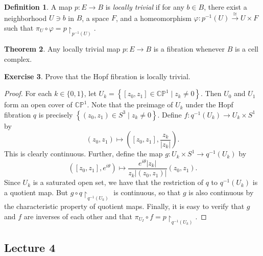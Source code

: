 \documentclass[10pt,letterpaper,cm]{nupset}
\theoremstyle{definition}
\newtheorem{defn}{Definition}[subsection]
\theoremstyle{theorem}
\newtheorem{theorem}[defn]{Theorem}
\newtheorem{exercise}[defn]{Exercise}
\theoremstyle{remark}
\newcommand{\CP}{\mathbb{CP}}
\newcommand{\1}{\mathbb{1}}
\newcommand{\0}{\vec 0}
\begin{document}
\begin{defn}\label{ltriv}
A map $p : E \to B$ is \textit{locally trivial} if for any $b\in B$, there exist a neighborhood $U\ni b$ in $B$, a space $F$, and a homeomorphism $\varphi: p^{-1}(U) \overset{\cong}{\longrightarrow} U \times F$ such that $\pi_U \circ \varphi = p \restriction_{p^{-1}(U)}$.
\end{defn}

\begin{theorem}
Any locally trivial map $p: E \to B$ is a fibration whenever $B$ is a cell complex. 
\end{theorem}

\begin{exercise}
Prove that the Hopf fibration is locally trivial.
\end{exercise}
\begin{proof}
For each $k \in \{0,1\}$, let $U_k = \left\{\left[z_0, z_1\right] \in \CP^1 \mid z_k \ne 0\right\}$. Then $U_0$ and $U_1$ form an open cover of $\CP^1$. Note that the preimage of $U_k$ under the Hopf fibration $q$ is precisely $\left\{\left(z_0, z_1\right) \in S^3 \mid z_k \ne 0\right\}$. Define $f: q^{-1}(U_k) \to  U_k \times S^1$ by  $$\left(z_0, z_1\right) \mapsto \left(\left[z_0, z_1\right], \frac{z_k}{\left\lvert{z_k}\right\lvert}\right).$$ This is clearly continuous. Further, define the map $g: U_k \times S^1 \to q^{-1}(U_k)$ by $$\left(\left[z_0, z_1\right], e^{i{\theta}}\right) \mapsto \frac{e^{i\theta}\left\lvert{z_k}\right\rvert}{z_k \left\lvert{\left(z_0, z_1\right)}\right\rvert}\left(z_0, z_1 \right).$$ Since $U_k$ is a saturated open set, we have that the restriction of $q$ to $q^{-1}(U_k)$ is a quotient map. But $g \circ q\restriction_{q^{-1}(U_k)}$ is continuous, so that $g$ is also continuous by the characteristic property of quotient maps. Finally, it is easy to verify that $g$ and $f$ are inverses of each other and that $\pi_{U_I} \circ f = p\restriction_{q^{-1}(U_k)}$.
\end{proof}

\subsection{Lecture 4}
\end{document}
